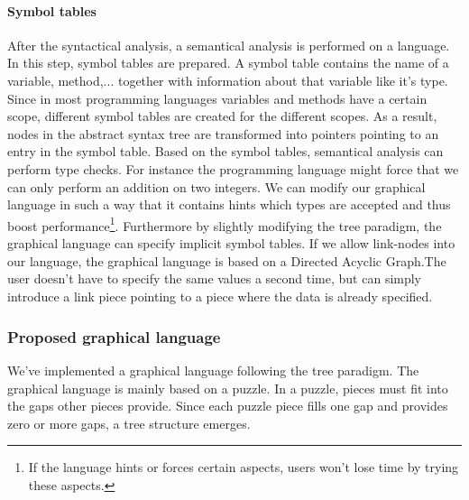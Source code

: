 \paragraph{Symbol tables}
After the syntactical analysis, a semantical analysis is performed on a
language. In this step, symbol tables are prepared. A symbol table contains the
name of a variable, method,... together with information about that variable
like it's type. Since in most programming languages variables and methods have
a certain scope, different symbol tables are created for the different scopes.
As a result, nodes in the abstract syntax tree are transformed into pointers
pointing to an entry in the symbol table. Based on the symbol tables,
semantical analysis can perform type checks. For instance the programming
language might force that we can only perform an addition on two integers. We
can modify our graphical language in such a way that it contains hints which
types are accepted and thus boost performance\footnote{If the language hints
or forces certain aspects, users won't lose time by trying these aspects.}.
Furthermore by slightly modifying the tree paradigm, the graphical language can
specify implicit symbol tables. If we allow link-nodes into our language, the
graphical language is based on a Directed Acyclic Graph.The user doesn't have to
specify the same values a second time, but can simply introduce a link
piece pointing to a piece where the data is already specified.
\subparagraph{}
\subsubsection{Proposed graphical language}
We've implemented a graphical language following the tree paradigm. The
graphical language is mainly based on a puzzle. In a puzzle, pieces must fit
into the gaps other pieces provide. Since each puzzle piece fills one gap and
provides zero or more gaps, a tree structure emerges.

